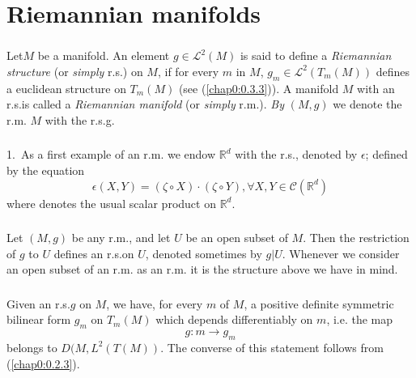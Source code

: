 \chapter{Riemannian manifolds}

\setcounter{section}{1}
\setcounter{subsection}{0}

\subsection{}\label{chap3:3.1.1}

\begin{defi*}
Let\pageoriginale $M$ be a manifold. An element
$g\in\mathscr{L}^{2}(M)$ is said to 
define a {\em Riemannian structure} (or {\em simply} r.s.) on $M$, if
for every $m$ in $M$, $g_{m}\in\mathscr{L}^{2}(T_{m}(M))$ defines a
euclidean structure on $T_{m}(M)$ (see (\ref{chap0:0.3.3})). A manifold $M$
with an r.s.\@ is called a {\em Riemannian manifold} (or {\em simply}
r.m.). {\em By} $(M,g)$ we denote the r.m. $M$ with the r.s.g.\@
\end{defi*}

\subsection{}\label{chap3:3.1.2}

\begin{examples*}
1.~As a first example of an r.m. we endow $\mathbb{R}^{d}$ with the
r.s., denoted by $\epsilon$; defined by the equation
$$
\epsilon(X,Y)=(\zeta\circ X)\cdot (\zeta\circ Y),\forall X,
Y\in\mathscr{C}(\mathbb{R}^{d}) 
$$
where denotes the usual scalar product on $\mathbb{R}^{d}$.
\end{examples*}

\setcounter{subsection}{2}
\subsection{}\label{chap3:3.1.3}
Let $(M,g)$ be any r.m., and let $U$ be an open subset of $M$. Then
the restriction of $g$ to $U$ defines an r.s.\@ on $U$, denoted
sometimes by $g|U$. Whenever we consider an open subset of an r.m. as
an r.m. it is the structure above we have in mind.

\subsection{}\label{chap3:3.1.4}

\begin{remarks*}
Given an r.s.\@ $g$ on $M$, we have, for every $m$ of $M$, a positive
definite symmetric bilinear form $g_{m}$ on $T_{m}(M)$ which depends
differentiably on $m$, i.e. the map
$$
g:m\to g_{m}
$$
belongs to $D(M,L^{2}(T(M))$. The converse of this statement follows
from (\ref{chap0:0.2.3}).
\end{remarks*}

